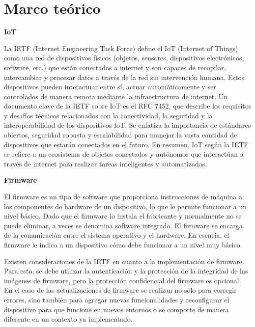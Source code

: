 \chapter{Marco teórico}

\textbf{IoT}

La IETF (Internet Engineering Task Force) define el IoT (Internet of Things) como una red de dispositivos físicos (objetos, sensores, dispositivos electrónicos, software, etc.) que están conectados a internet y son capaces de recopilar, intercambiar y procesar datos a través de la red sin intervención humana. Estos dispositivos pueden interactuar entre sí, actuar automáticamente y ser controlados de manera remota mediante la infraestructura de internet.
Un documento clave de la IETF sobre IoT es el RFC 7452, que describe los requisitos y desafíos técnicos relacionados con la conectividad, la seguridad y la interoperabilidad de los dispositivos IoT. Se enfatiza la importancia de estándares abiertos, seguridad robusta y escalabilidad para manejar la vasta cantidad de dispositivos que estarán conectados en el futuro.
En resumen, IoT según la IETF se refiere a un ecosistema de objetos conectados y autónomos que interactúan a través de internet para realizar tareas inteligentes y automatizadas.\cite{rfc7452}

\textbf{Firmware}

El firmware es un tipo de software que proporciona instrucciones de máquina a los componentes de hardware de un dispositivo, lo que le permite funcionar a un nivel básico. Dado que el firmware lo instala el fabricante y normalmente no se puede eliminar, a veces se denomina software integrado. El firmware se encarga de la comunicación entre el sistema operativo y el hardware. En esencia, el firmware le indica a un dispositivo cómo debe funcionar a un nivel muy básico.\cite{avg2024}

Existen consideraciones de la IETF en cuanto a la implementación de firmware. Para esto, se debe utilizar la autenticación y la protección de la integridad de las imágenes de firmware, pero la protección confidencial del firmware es opcional. En el caso de las actualizaciones de firmware se realizan no sólo para corregir errores, sino también para agregar nuevas funcionalidades y reconfigurar el dispositivo para que funcione en nuevos entornos o se comporte de manera diferente en un contexto ya implementado.\cite{rfc9019}


